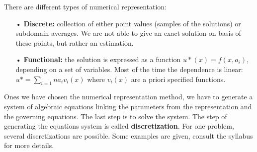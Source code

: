 There are different types of numerical representation:

\begin{itemize}
\item[•] \textbf{Discrete:} collection of either point values (samples of the solutions) or subdomain averages. We are not able to give an exact solution on basis of these points, but rather an estimation.
\item[•] \textbf{Functional:} the solution is expressed as a function $u*(x) = f(x,a_i)$, depending on a set of variables. Most of the time the dependence is linear: $u* = \sum_{i=1}n a_i v_i(x)$ where $v_i(x)$ are a priori specified functions. \\
\end{itemize}

Ones we have chosen the numerical representation method, we have to generate a system of algebraic equations linking the parameters from the representation and the governing equations. The last step is to solve the system. The step of generating the equations system is called \textbf{discretization}. For one problem, several discretizations are possible. Some examples are given, consult the syllabus for more details. 